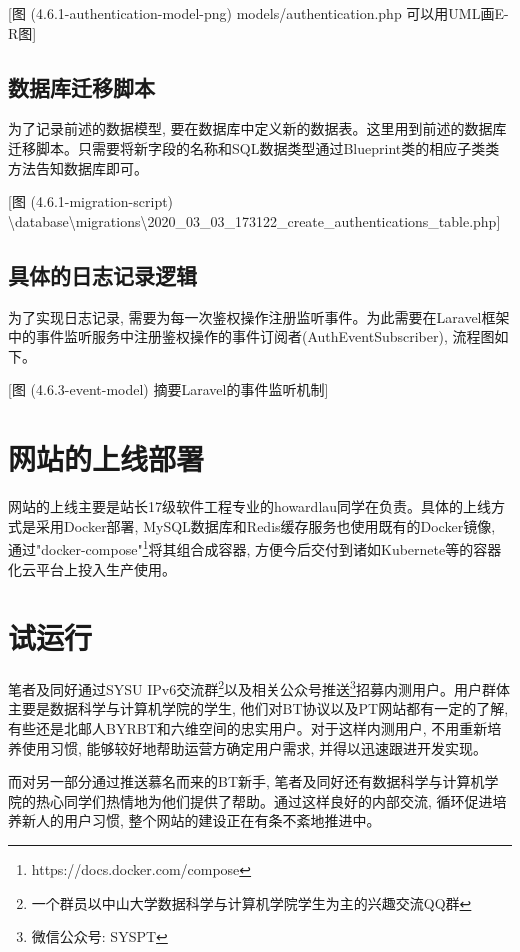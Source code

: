 [图 (4.6.1-authentication-model-png) models/authentication.php 可以用UML画E-R图]


\subsection{数据库迁移脚本}

为了记录前述的数据模型, 要在数据库中定义新的数据表。这里用到前述的数据库迁移脚本。只需要将新字段的名称和SQL数据类型通过Blueprint类的相应子类类方法告知数据库即可。

[图 (4.6.1-migration-script) \textbackslash database\textbackslash migrations\textbackslash 2020\_03\_03\_173122\_create\_authentications\_table.php]

\subsection{具体的日志记录逻辑}

为了实现日志记录, 需要为每一次鉴权操作注册监听事件。为此需要在Laravel框架中的事件监听服务中注册鉴权操作的事件订阅者(AuthEventSubscriber), 流程图如下。

[图 (4.6.3-event-model) 摘要Laravel的事件监听机制]


\section{网站的上线部署}

网站的上线主要是站长17级软件工程专业的howardlau同学在负责。具体的上线方式是采用Docker部署, MySQL数据库和Redis缓存服务也使用既有的Docker镜像, 通过"docker-compose"\footnote{https://docs.docker.com/compose}将其组合成容器, 方便今后交付到诸如Kubernete等的容器化云平台上投入生产使用。

\section{试运行}
\label{sec:preop}

笔者及同好通过SYSU IPv6交流群\footnote{一个群员以中山大学数据科学与计算机学院学生为主的兴趣交流QQ群}以及相关公众号推送\footnote{微信公众号: SYSPT}招募内测用户。用户群体主要是数据科学与计算机学院的学生, 他们对BT协议以及PT网站都有一定的了解, 有些还是北邮人BYRBT和六维空间的忠实用户。对于这样内测用户, 不用重新培养使用习惯, 能够较好地帮助运营方确定用户需求, 并得以迅速跟进开发实现。

而对另一部分通过推送慕名而来的BT新手, 笔者及同好还有数据科学与计算机学院的热心同学们热情地为他们提供了帮助。通过这样良好的内部交流, 循环促进培养新人的用户习惯, 整个网站的建设正在有条不紊地推进中。
